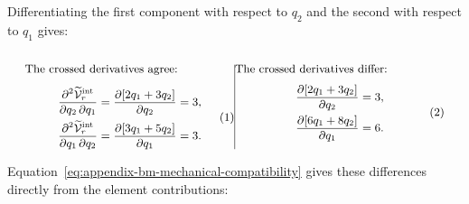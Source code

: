 \documentclass[a4paper,12pt]{article}
\begin{document}
Differentiating the first component with respect to $q_2$ and the second with respect to $q_1$ gives:

\begin{subequations}
 \label{eq:appendix-structural-cross-derivatives}
 \noindent
 \begin{minipage}[t]{0.48\linewidth}
  \vspace{0pt}\small\raggedright
  The crossed derivatives agree:
  \begin{equation}
   \begin{aligned}
    \frac{\partial^2\widetilde{\mathcal V}_r^{\mathrm{int}}}
         {\partial q_2\,\partial q_1}
    &=\frac{\partial[2q_1+3q_2]}{\partial q_2}=3,\\
    \frac{\partial^2\widetilde{\mathcal V}_r^{\mathrm{int}}}
         {\partial q_1\,\partial q_2}
    &=\frac{\partial[3q_1+5q_2]}{\partial q_1}=3.
   \end{aligned}
   \label{eq:appendix-structural-classical-cross-derivatives}
  \end{equation}
 \end{minipage}\hfill\vrule width 0.4pt\hfill%
 \begin{minipage}[t]{0.48\linewidth}
  \vspace{0pt}\small\raggedright
  The crossed derivatives differ:
  \begin{equation}
   \begin{aligned}
    \frac{\partial[2q_1+3q_2]}{\partial q_2}&=3,\\
    \frac{\partial[6q_1+8q_2]}{\partial q_1}&=6.
   \end{aligned}
   \label{eq:appendix-structural-bm-cross-derivatives}
  \end{equation}
 \end{minipage}
\end{subequations}

Equation~\eqref{eq:appendix-bm-mechanical-compatibility} gives these differences directly from the element contributions:
\end{document}
